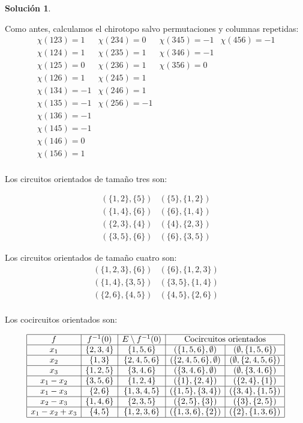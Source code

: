 \documentclass[10pt]{article}
\theoremstyle{definition}
\newtheorem*{sol}{Solución}
\begin{document}
\begin{sol}
\begin{enumerate}[(a)]
Como antes, calculamos el chirotopo salvo permutaciones y columnas repetidas:
$$\begin{array}{l|l|l|l}
\chi(123)=1 & \chi(234)=0 & \chi(345)=-1 & \chi(456)=-1\\
\chi(124)=1 & \chi(235)=1 & \chi(346)=-1 &\\
\chi(125)=0 & \chi(236)=1 & \chi(356)=0 &\\
\chi(126)=1 & \chi(245)=1 & &\\
\chi(134)=-1 & \chi(246)=1 & &\\
\chi(135)=-1 & \chi(256)=-1 & &\\
\chi(136)=-1 & & &\\
\chi(145)=-1 & & &\\
\chi(146)=0 & & &\\
\chi(156)=1 & & &\\
\end{array}$$

Los circuitos orientados de tamaño tres son:

$$\begin{array}{cc}
    (\{1,2\},\{5\}) & (\{5\},\{1,2\}) \\
    (\{1,4\},\{6\}) & (\{6\},\{1,4\}) \\
    (\{2,3\},\{4\}) & (\{4\},\{2,3\}) \\
    (\{3,5\},\{6\}) & (\{6\},\{3,5\}) 
\end{array}$$

Los circuitos orientados de tamaño cuatro son:
$$\begin{array}{cc}
    (\{1,2,3\},\{6\}) & (\{6\},\{1,2,3\}) \\
    (\{1,4\},\{3,5\}) & (\{3,5\},\{1,4\}) \\
    (\{2,6\},\{4,5\}) & (\{4,5\},\{2,6\}) \\
\end{array}$$

Los cocircuitos orientados son:

$$\begin{array}{|c|c|c|c|c|}
\hline f & f^{-1}(0) & E\setminus f^{-1}(0) & \multicolumn{2}{c|}{\text{Cocircuitos orientados}} \\
\hline x_1 & \{2,3,4\} & \{1,5,6\} & (\{1,5,6\},\emptyset) & (\emptyset,\{1,5,6\})  \\
\hline x_2 & \{1,3\} & \{2,4,5,6\} & (\{2,4,5,6\},\emptyset) & (\emptyset,\{2,4,5,6\})  \\
\hline x_3 & \{1,2,5\} & \{3,4,6\} & (\{3,4,6\},\emptyset) & (\emptyset,\{3,4,6\}) \\
\hline x_1-x_2 & \{3,5,6\} & \{1,2,4\} & (\{1\},\{2,4\}) & (\{2,4\},\{1\})  \\
\hline x_1-x_3 & \{2,6\} & \{1,3,4,5\} & (\{1,5\},\{3,4\}) & (\{3,4\},\{1,5\})  \\
\hline x_2-x_3 & \{1,4,6\} & \{2,3,5\} & (\{2,5\},\{3\}) & (\{3\},\{2,5\})  \\
\hline x_1-x_2+x_3 & \{4,5\} & \{1,2,3,6\} & (\{1,3,6\},\{2\}) & (\{2\},\{1,3,6\})  \\
\hline
\end{array}$$


\end{enumerate}
\end{sol}
\end{document}

